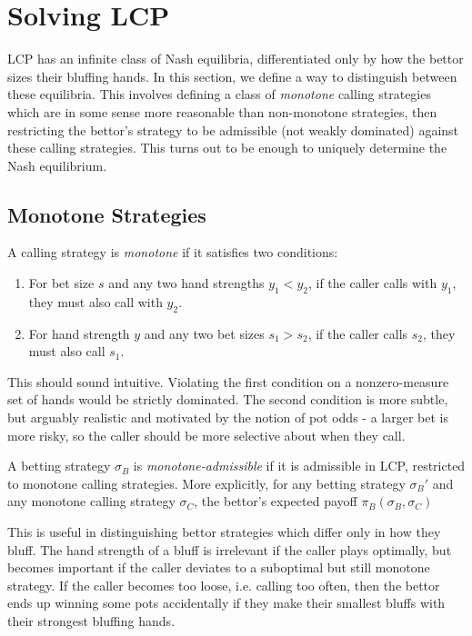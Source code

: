 \documentclass[../../main/main.tex]{subfiles}
\begin{document}
\section{Solving LCP}

LCP has an infinite class of Nash equilibria, differentiated only by how the bettor sizes their bluffing hands. In this section, we define a way to distinguish between these equilibria. This involves defining a class of \textit{monotone} calling strategies which are in some sense more reasonable than non-monotone strategies, then restricting the bettor's strategy to be admissible (not weakly dominated) against these calling strategies. This turns out to be enough to uniquely determine the Nash equilibrium.

\subsection{Monotone Strategies}

\begin{definition}
    A calling strategy is \textit{monotone} if it satisfies two conditions:
    \begin{enumerate}
        \item For bet size $s$ and any two hand strengths $y_1 < y_2$, if the caller calls with $y_1$, they must also call with $y_2$.
        \item For hand strength $y$ and any two bet sizes $s_1 > s_2$, if the caller calls $s_2$, they must also call $s_1$.
    \end{enumerate}
\end{definition}

This should sound intuitive. Violating the first condition on a nonzero-measure set of hands would be strictly dominated. The second condition is more subtle, but arguably realistic and motivated by the notion of pot odds - a larger bet is more risky, so the caller should be more selective about when they call.

\begin{definition}
    A betting strategy $\sigma_B$ is \textit{monotone-admissible} if it is admissible in LCP, restricted to monotone calling strategies. More explicitly, for any betting strategy $\sigma_B'$ and any monotone calling strategy $\sigma_C$, the bettor's expected payoff $\pi_B(\sigma_B,\sigma_C)$ 
\end{definition}

This is useful in distinguishing bettor strategies which differ only in how they bluff. The hand strength of a bluff is irrelevant if the caller plays optimally, but becomes important if the caller deviates to a suboptimal but still monotone strategy. If the caller becomes too loose, i.e. calling too often, then the bettor ends up winning some pots accidentally if they make their smallest bluffs with their strongest bluffing hands.
\end{document}
